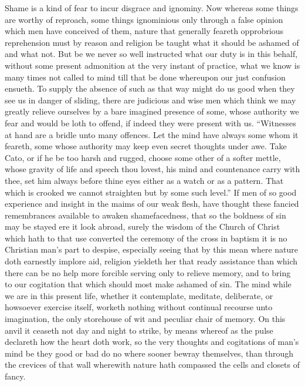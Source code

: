 Shame is a kind of fear to incur disgrace and ignominy. Now whereas some things are worthy of reproach, some things ignominious only through a false opinion which men have conceived of them, nature that generally feareth opprobrious reprehension must by reason and religion be taught what it should be ashamed of and what not. But be we never so well instructed what our duty is in this behalf, without some present admonition at the very instant of practice, what we know is many times not called to mind till that be done whereupon our just confusion ensueth. To supply the absence of such as that way might do us good when they see us in danger of sliding, there are judicious and wise men which think we may greatly relieve ourselves by a bare imagined presence of some, whose authority we fear and would be loth  to offend, if indeed they were present with us.
 “Witnesses at hand are a bridle unto many offences. Let the mind have always some whom it feareth, some whose authority may keep even secret thoughts under awe. Take Cato, or if he be too harsh and rugged, choose some other of a softer mettle, whose gravity of life and speech thou lovest, his mind and countenance carry with thee, set him always before thine eyes either as a watch or as a pattern. That which is crooked we cannot straighten but by some such level.”
If men of so good experience and insight in the maims of our weak flesh, have thought these fancied remembrances available to awaken shamefacedness, that so the boldness of sin may be stayed ere it look abroad, surely the wisdom of the Church of Christ which hath to that use converted the ceremony of the cross in baptism it is no Christian man’s part to despise, especially seeing that by this mean where nature doth earnestly implore aid, religion yieldeth her that ready assistance than which there can be no help more forcible serving only to relieve memory, and to bring to our cogitation that which should most make ashamed of sin.
The mind while we are in this present life, whether it contemplate, meditate, deliberate, or howsoever exercise itself, worketh nothing without continual recourse unto imagination, the only storehouse of wit and peculiar chair of memory. On this anvil it ceaseth not day and night to strike, by means whereof as the pulse declareth how the heart doth work, so the very thoughts and cogitations of man’s mind be they good or bad do no where sooner bewray themselves, than  through the crevices of that wall wherewith nature hath compassed the cells and closets of fancy.
